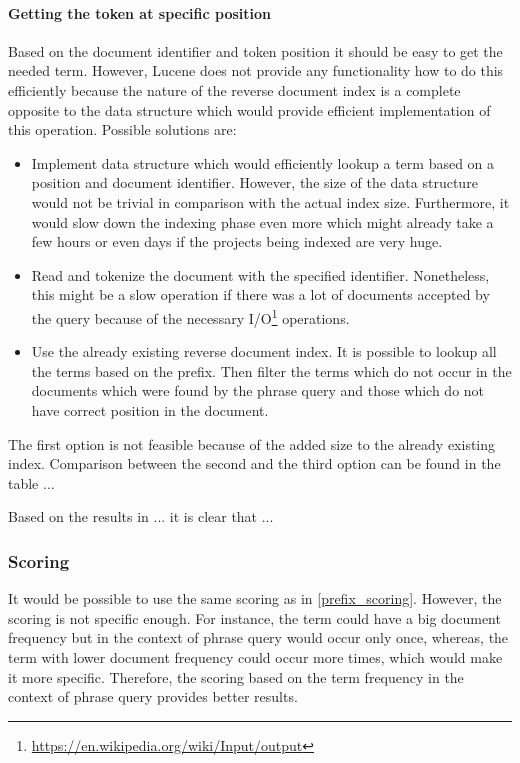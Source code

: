 \paragraph{Getting the token at specific position}
Based on the document identifier and token position it should be easy to get the needed term. However, Lucene does not
provide any functionality how to do this efficiently because the nature of the reverse document index is a complete
opposite to the data structure which would provide efficient implementation of this operation. Possible solutions are:
\begin{itemize}
    \item Implement data structure which would efficiently lookup a term based on a position and document identifier.
    However, the size of the data structure would not be trivial in comparison with the actual index size. Furthermore,
    it would slow down the indexing phase even more which might already take a few hours or even days if the projects
    being indexed are very huge.
    \item Read and tokenize the document with the specified identifier. Nonetheless, this might be a slow operation if there
    was a lot of documents accepted by the query because of the necessary
    I/O\footnote{\url{https://en.wikipedia.org/wiki/Input/output}} operations.
    \item Use the already existing reverse document index. It is possible to lookup all the terms based on the prefix.
    Then filter the terms which do not occur in the documents which were found by the phrase query and those which
    do not have correct position in the document.
\end{itemize}

The first option is not feasible because of the added size to the already existing index. Comparison between the
second and the third option can be found in the table ...


Based on the results in ... it is clear that ...

\subsubsection{Scoring}
It would be possible to use the same scoring as in \ref{prefix_scoring}. However, the scoring is not specific enough.
For instance, the term could have a big document frequency but in the context of phrase query would occur only once,
whereas, the term with lower document frequency could occur more times, which would make it more specific. Therefore,
the scoring based on the term frequency in the context of phrase query provides better results.

